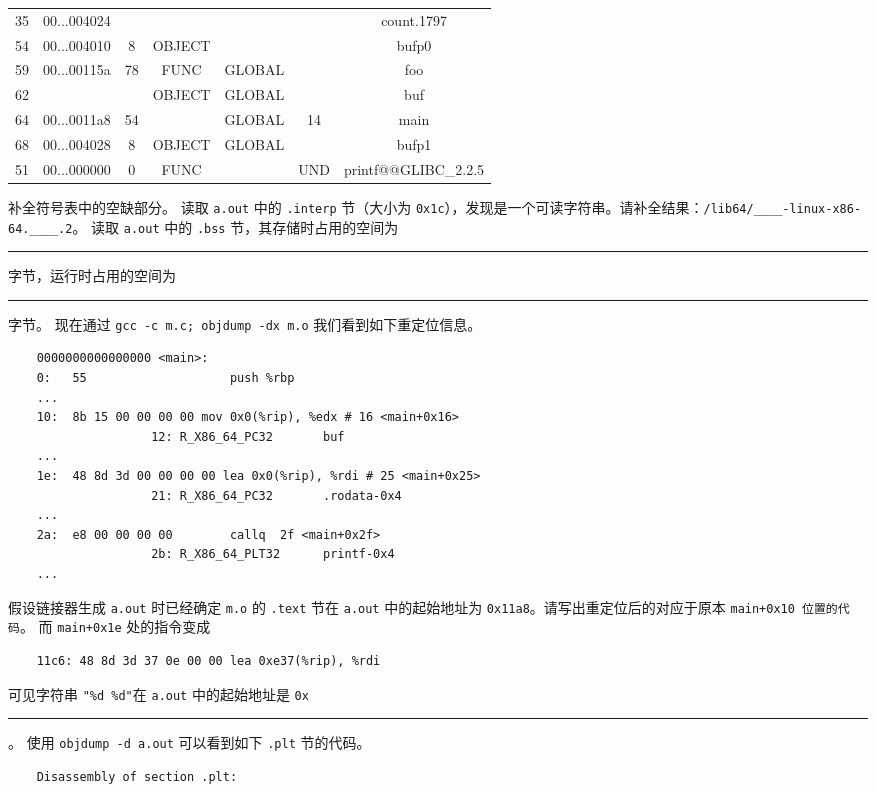 \begin{problems}
\begin{table}[H]
\begin{tabular}{ccccccc}
                \multicolumn{1}{|c}{35} & 00...004024 &  & &  &  & \multicolumn{1}{c|}{count.1797} \\
                \multicolumn{1}{|c}{54} & 00...004010 & 8 & OBJECT &  &  & \multicolumn{1}{c|}{bufp0} \\
                \multicolumn{1}{|c}{59} & 00...00115a & 78 & FUNC & GLOBAL &  & \multicolumn{1}{c|}{foo} \\
                \multicolumn{1}{|c}{62} &  &  & OBJECT & GLOBAL &  & \multicolumn{1}{c|}{buf} \\
                \multicolumn{1}{|c}{64} & 00...0011a8 & 54 &  & GLOBAL & 14 & \multicolumn{1}{c|}{main} \\
                \multicolumn{1}{|c}{68} & 00...004028 & 8 & OBJECT & GLOBAL &  & \multicolumn{1}{c|}{bufp1} \\
                \multicolumn{1}{|c}{51} & 00...000000 & 0 & FUNC &  & UND & \multicolumn{1}{c|}{printf@@GLIBC\_2.2.5} \\ \hline
            \end{tabular}
        \end{table}
            \subqn 补全符号表中的空缺部分。
            \subqn 读取 \verb|a.out| 中的 \verb|.interp| 节（大小为 \verb|0x1c|），发现是一个可读字符串。请补全结果：\verb|/lib64/____-linux-x86-64.____.2|。
            \subqn 读取 \verb|a.out| 中的 \verb|.bss| 节，其存储时占用的空间为 \rule{2.5cm}{0.25mm} 字节，运行时占用的空间为 \rule{2.5cm}{0.25mm} 字节。
        \qn 现在通过 \verb|gcc -c m.c; objdump -dx m.o| 我们看到如下重定位信息。
        \begin{verbatim}
    0000000000000000 <main>:
    0:   55                    push %rbp
    ...
    10:  8b 15 00 00 00 00 mov 0x0(%rip), %edx # 16 <main+0x16>
                    12: R_X86_64_PC32       buf
    ...
    1e:  48 8d 3d 00 00 00 00 lea 0x0(%rip), %rdi # 25 <main+0x25>
                    21: R_X86_64_PC32       .rodata-0x4
    ...
    2a:  e8 00 00 00 00        callq  2f <main+0x2f>
                    2b: R_X86_64_PLT32      printf-0x4
    ...
        \end{verbatim}
            \subqn 假设链接器生成 \verb|a.out| 时已经确定 \verb|m.o| 的 \verb|.text| 节在 \verb|a.out| 中的起始地址为 \verb|0x11a8|。请写出重定位后的对应于原本 \verb|main+0x10 位置的代码|。
            \subqn 而 \verb|main+0x1e| 处的指令变成
            \begin{verbatim}
    11c6: 48 8d 3d 37 0e 00 00 lea 0xe37(%rip), %rdi
            \end{verbatim}
            可见字符串 \verb|"%d %d"|在 \verb|a.out| 中的起始地址是 \verb|0x|\rule{2.5cm}{0.25mm}。
        \qn 使用 \verb|objdump -d a.out| 可以看到如下 \verb|.plt| 节的代码。
        \begin{verbatim}
    Disassembly of section .plt:
    

\end{verbatim}
\end{problems}
